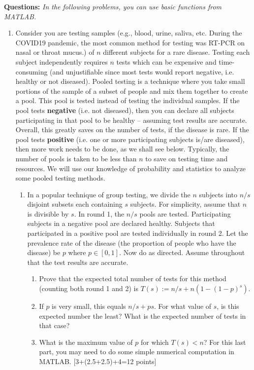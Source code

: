 \documentclass[11pt]{article}
\begin{document}
\textbf{Questions:}
\textit{In the following problems, you can use basic functions from MATLAB.}
\begin{enumerate}
\item Consider you are testing samples (e.g., blood, urine, saliva, etc. During the COVID19 pandemic, the most common method for testing was RT-PCR on nasal or throat mucus.) of $n$ different subjects for a rare disease. Testing each subject independently requires $n$ tests which can be expensive and time-consuming (and unjustifiable since most tests would report negative, i.e. healthy or not diseased). Pooled testing is a technique where you take small portions of the sample of a subset of people and mix them together to create a pool. This pool is tested instead of testing the individual samples. If the pool tests \textbf{negative} (i.e. not diseased), then you can declare all subjects participating in that pool to be healthy -- assuming test results are accurate. Overall, this greatly saves on the number of tests, if the disease is rare. If the pool tests \textbf{positive} (i.e. one or more participating subjects is/are diseased), then more work needs to be done, as we shall see below. Typically, the number of pools is taken to be less than $n$ to save on testing time and resources. We will use our knowledge of probability and statistics to analyze some pooled testing methods. 
\begin{enumerate}
\item In a popular technique of group testing, we divide the $n$ subjects into $n/s$ disjoint subsets each containing $s$ subjects. For simplicity, assume that $n$ is divisible by $s$. In round 1, the $n/s$ pools are tested. Participating subjects in a negative pool are declared healthy. Subjects that participated in a positive pool are tested individually in round 2. Let the prevalence rate of the disease (the proportion of people who have the disease) be $p$ where $p \in [0,1]$. Now do as directed. Assume throughout that the test results are accurate. 
\begin{enumerate}
\item Prove that the expected total number of tests for this method (counting both round 1 and 2) is $T(s) := n/s + n(1-(1-p)^s)$. 
\item If $p$ is very small, this equals $n/s + ps$. For what value of $s$, is this expected number the least? What is the expected number of tests in that case? 
\item What is the maximum value of $p$ for which $T(s) < n$? For this last part, you may need to do some simple numerical computation in MATLAB. \textsf{[3+(2.5+2.5)+4=12 points]}
\end{enumerate}


\end{enumerate}
\end{enumerate}
\end{document}
